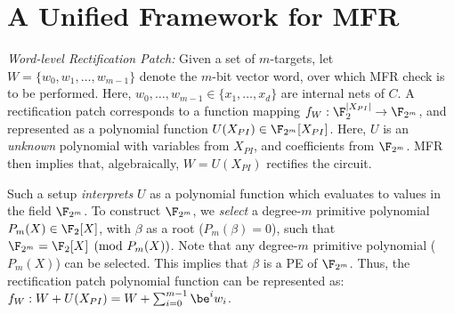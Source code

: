 \section{A Unified Framework for MFR}\label{sec:comps}


{\it Word-level Rectification Patch:} 
Given a set of $m$-targets, let $W = \{w_0,w_1,\dots,w_{m-1}\}$ denote the $m$-bit vector word,
over which MFR check is to be performed. 
Here, $w_0,\dots,w_{m-1}\in \{x_1,\dots,x_d\}$
are internal nets of $C$. A rectification patch corresponds to 
a function mapping $f_W: \F_2^{|X_{PI}|}\rightarrow\F_{2^m}$, and
represented as a polynomial function $U(X_{PI}) \in
\F_{2^m}[X_{PI}]$. Here, $U$ is an {\it unknown} polynomial
with variables from $X_{PI}$, and coefficients from $\F_{2^m}$. MFR
then implies that, algebraically, $W = U(X_{PI})$ rectifies the
circuit. 

Such a setup {\it interprets} $U$ as a polynomial function which
evaluates to values in the field $\F_{2^m}$. To construct $\F_{2^m}$,
we {\it select} a degree-$m$ primitive polynomial $P_m(X)\in\F_2[X]$, with
$\beta$ as a root ($P_m(\beta)=0$), such that 
$\F_{2^m} = \F_2[X] \pmod{ P_m(X)}$. Note that any degree-$m$
primitive polynomial ($P_m(X)$) can be selected. This implies that
$\beta$ is a PE of $\F_{2^m}$. Thus, the rectification patch polynomial
function can be represented as: $f_W: W + U(X_{PI}) = W +
\sum_{i=0}^{m-1}\be^iw_i$.  

